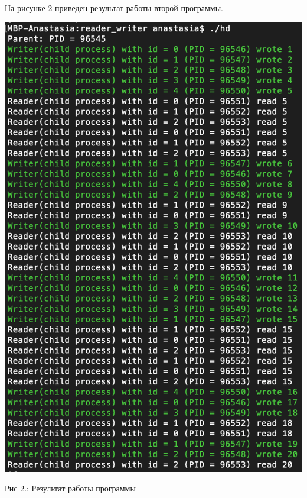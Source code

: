 \documentclass[12pt]{report}
\begin{document}
На рисунке 2 приведен результат работы второй программы.
\begin{center}
		\includegraphics[scale=0.8]{pics/RW.png}
		
			Рис 2.:  Результат работы программы 
\end{center}
\end{document}
